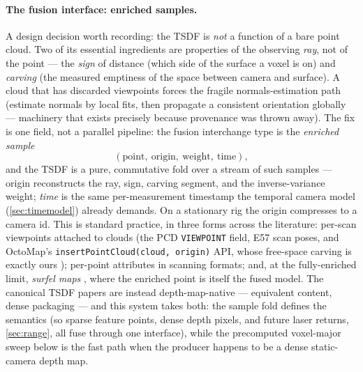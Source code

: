 \documentclass[11pt]{article}
\theoremstyle{definition}
\newcommand{\code}[1]{\texttt{#1}}
\begin{document}
\paragraph{The fusion interface: enriched samples.} A design decision
worth recording: the TSDF is \emph{not} a function of a bare point
cloud. Two of its essential ingredients are properties of the observing
\emph{ray}, not of the point --- the \emph{sign} of distance (which
side of the surface a voxel is on) and \emph{carving} (the measured
emptiness of the space between camera and surface). A cloud that has
discarded viewpoints forces the fragile normals-estimation path
(estimate normals by local fits, then propagate a consistent
orientation globally \cite{Hoppe1992} --- machinery that exists
precisely because provenance was thrown away). The fix is one field,
not a parallel pipeline: the fusion interchange type is the
\emph{enriched sample}
\[
(\text{point},\ \text{origin},\ \text{weight},\ \text{time}),
\]
and the TSDF is a pure, commutative fold over a stream of such samples
--- origin reconstructs the ray, sign, carving segment, and the
inverse-variance weight; \emph{time} is the same per-measurement
timestamp the temporal camera model (\autoref{sec:timemodel}) already
demands. On a stationary rig the origin compresses to a camera id.
This is standard practice, in three forms across the literature:
per-scan viewpoints attached to clouds (the PCD \code{VIEWPOINT}
field, E57 scan poses, and OctoMap's
\code{insertPointCloud(cloud, origin)} API, whose free-space carving is
exactly ours \cite{Hornung2013}); per-point attributes in scanning
formats; and, at the fully-enriched limit, \emph{surfel maps}
\cite{Keller2013}, where the enriched point is itself the fused model.
The canonical TSDF papers \cite{CurlessLevoy1996,Newcombe2011} are
instead depth-map-native --- equivalent content, dense packaging ---
and this system takes both: the sample fold defines the semantics
(so sparse feature points, dense depth pixels, and future laser
returns, \autoref{sec:range}, all fuse through one interface), while
the precomputed voxel-major sweep below is the fast path when the
producer happens to be a dense static-camera depth map.
\end{document}
